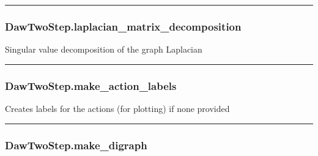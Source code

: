 \begin{center}\rule{0.5\linewidth}{\linethickness}\end{center}

\subsubsection{DawTwoStep.laplacian\_matrix\_decomposition}\label{dawtwostep.laplacian_matrix_decomposition}

\begin{Shaded}
\begin{Highlighting}[]
\NormalTok{)}
\end{Highlighting}
\end{Shaded}

Singular value decomposition of the graph Laplacian

\begin{center}\rule{0.5\linewidth}{\linethickness}\end{center}

\subsubsection{DawTwoStep.make\_action\_labels}\label{dawtwostep.make_action_labels}

\begin{Shaded}
\begin{Highlighting}[]
\NormalTok{)}
\end{Highlighting}
\end{Shaded}

Creates labels for the actions (for plotting) if none provided

\begin{center}\rule{0.5\linewidth}{\linethickness}\end{center}

\subsubsection{DawTwoStep.make\_digraph}\label{dawtwostep.make_digraph}

\begin{Shaded}
\begin{Highlighting}[]
\NormalTok{)}
\end{Highlighting}
\end{Shaded}

